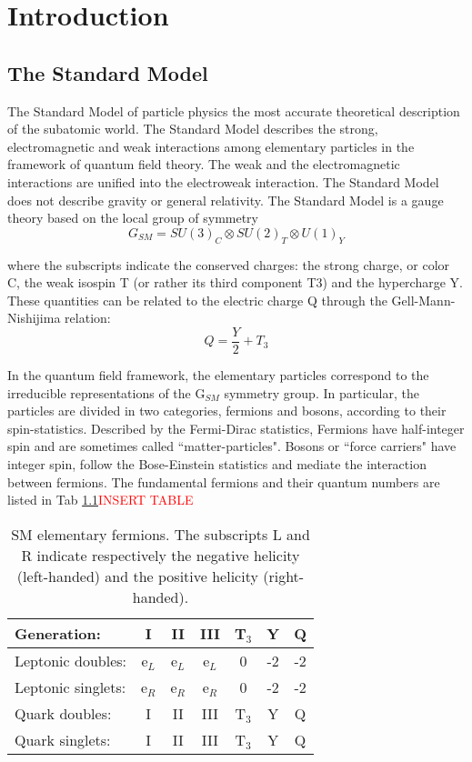 \chapter{Introduction}

\section{The Standard Model}
The Standard Model of particle physics the most accurate theoretical description of the subatomic world.  The Standard Model describes the strong, electromagnetic and weak interactions among  elementary particles in the framework of quantum field theory. The weak and the electromagnetic interactions are unified into the electroweak interaction. The Standard Model does not describe gravity or general relativity.
The Standard Model is a gauge theory based on the local group of symmetry
\begin{equation}
G_{SM} = SU(3)_C  \otimes SU(2)_T \otimes U(1)_Y
\end{equation}

where the subscripts indicate the conserved charges: the strong charge, or color C, the weak isospin T (or rather its third component T3) and the hypercharge Y. These quantities can be related to the electric charge Q through the Gell-Mann-Nishijima relation:
\begin{equation}
Q = \frac{Y}{2} + T_3
\end{equation}

In the quantum field framework, the elementary particles correspond to the irreducible representations of the G$_{SM}$ symmetry group. In particular, the particles are divided in two categories, fermions and bosons, according to their spin-statistics. Described by the Fermi-Dirac statistics, Fermions have half-integer spin and are sometimes called ``matter-particles". Bosons or ``force carriers" have integer spin, follow the Bose-Einstein statistics and mediate the interaction between fermions. The fundamental fermions and their quantum numbers are listed in Tab \ref{tab:SMParticles}\textcolor{red}{INSERT TABLE}
\begin{table}[!htbp]

\begin{tabular}{|l ccc|c|c|c|}
\hline
Generation: & I & II & III & T$_3$ & Y & Q \\
\hline
Leptonic doubles: & e$_L$ & e$_L$ & e$_L$ & 0 & -2 & -2 \\
Leptonic singlets: & e$_R$ & e$_R$ & e$_R$ & 0 & -2 & -2 \\
\hline
Quark doubles: & I & II & III & T$_3$ & Y & Q \\
Quark singlets: & I & II & III & T$_3$ & Y & Q \\
\hline
\end{tabular}
\caption{SM elementary fermions. The subscripts L and R indicate respectively the negative helicity (left-handed) and the positive helicity (right- handed).}
\label{tab:SMParticles}
\end{table}





